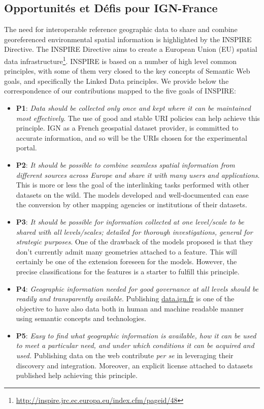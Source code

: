 \documentclass[a4paper,11pt,twoside]{report}
\begin{document}
\subsection*{Opportunités et Défis pour IGN-France}
\label{sec:challenges}

 The need for interoperable reference geographic data to share and combine georeferenced environmental spatial information is highlighted by the INSPIRE Directive. The INSPIRE Directive \cite{inspire2009} aims to create a European Union (EU) spatial data infrastructure\footnote{\url{ http://inspire.jrc.ec.europa.eu/index.cfm/pageid/48}}. INSPIRE is based on a number of high level common principles, with some of them very closed to the key concepts of Semantic Web goals, and specifically the Linked Data principles. We provide below the correspondence of our contributions mapped to the five goals of INSPIRE:  
\begin{itemize}
\item \textbf{P1}: \textit{Data should be collected only once and kept where it can be maintained most effectively}. The use of good and stable URI policies can help achieve this principle. IGN as a French geospatial dataset provider, is committed to accurate information, and so will be the URIs chosen for the experimental portal.
\item \textbf{P2}: \textit{It should be possible to combine seamless spatial information from different sources across Europe and share it with many users and applications}. This is more or less the goal of the interlinking tasks performed with other datasets on the wild. The models developed and well-documented can ease the conversion by other mapping agencies or institutions of their datasets.  
\item \textbf{P3}:  \textit{It should be possible for information collected at one level/scale to be shared with all levels/scales; detailed for thorough investigations, general for strategic purposes}. One of the drawback of the models proposed is that they don't currently admit many geometries attached to a feature. This will certainly be one of the extension foreseen for the models. However, the precise classifications for the features is a starter to fulfill this principle.
\item \textbf{P4}: \textit{Geographic information needed for good governance at all levels should be readily and transparently available}. Publishing \url{data.ign.fr} is one of the objective to have also data both in human and machine readable manner using semantic concepts and technologies.
\item \textbf{P5}: \textit{Easy to find what geographic information is available, how it can be used to meet a particular need, and under which conditions it can be acquired and used.} Publishing data on the web contribute \textit{per se} in leveraging their discovery and integration. Moreover, an explicit license attached to datasets published help achieving this principle.
\end{itemize}
\end{document}
